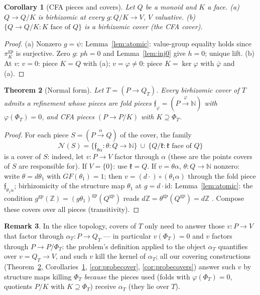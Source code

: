 \documentclass[11pt]{article}
\newtheorem{theorem}{Theorem}[section]
\newtheorem{corollary}[theorem]{Corollary}
\theoremstyle{definition}
\newtheorem{remark}[theorem]{Remark}
\newcommand{\gp}{\mathrm{gp}}
\newcommand{\Z}{\mathbb{Z}}
\begin{document}
\begin{corollary}[CFA pieces and covers]\label{cor:cfa}
Let $Q$ be a monoid and $K$ a face.
\textup{(}a\textup{)} $Q\to Q/K$ is birhizomic at every
$g:Q/K\to V$, $V$ valuative.
\textup{(}b\textup{)} $\{Q\to Q/K:K\text{ face of }Q\}$ is a
birhizomic cover \textup{(}the \emph{CFA cover}\textup{)}.
\end{corollary}

\begin{proof}
(a) Nonzero $g=\psi$: Lemma~\ref{lem:atomic}: value-group equality
holds since $\pi_K^{\gp}$ is surjective. Zero $g$: $ph=0$ and
Lemma~\ref{lem:inj0} give $h=0$; unique lift.
(b) At $v$: $v=0$: piece $K=Q$ with (a); $v=\varphi\ne0$: piece
$K=\ker\varphi$ with $\bar\varphi$ and (a).
\end{proof}

\begin{theorem}[Normal form]\label{thm:normalform}
Let $T=(P\to Q_T)$. Every birhizomic cover of $T$ admits a refinement
whose pieces are fold pieces $\mathfrak f_\varphi=
(P\xrightarrow{\varphi}\mathbb N)$ with $\varphi(\Phi_T)=0$, 
and CFA
pieces $(P\to P/K)$ with $K\supseteq\Phi_T$.
\end{theorem}

\begin{proof}
For each piece $S=(P\xrightarrow{\alpha}Q)$ of the cover, 
the family
\[
\mathcal N(S)=
\{\mathfrak f_{\theta\alpha}:\theta:Q\to\mathbb N\}
\ \cup\ \{Q/\mathfrak k:\mathfrak k\text{ face of }Q\}
\]
is a cover of $S$: indeed, let $v:P\to V$ factor through
$\alpha$ (these are the points covers of $S$ are responsible for).
If $V=\{0\}$: use $\mathfrak k=Q$. If $v=\theta\alpha$,
$\theta:Q\to\mathbb N$ nonzero: write $\theta=d\theta_1$ with
${GF}(\theta_1)=1$; then $v=(d\cdot)\circ(\theta_1\alpha)$ through
the fold piece $\mathfrak f_{\theta_1\alpha}$; birhizomicity of the
structure map $\theta_1$ at $g=d\cdot\mathrm{id}$:
Lemma~\ref{lem:atomic}: the condition
$g^{\gp}(\Z)=(g\theta_1)^{\gp}(Q^{\gp})$ reads
$d\Z=\theta^{\gp}(Q^{\gp})=d\Z$ \checkmark. Compose these covers over all
pieces (transitivity).
\end{proof}

\begin{remark}\label{rem:cover-points}
In the slice topology, covers of $T$ only need to answer those
$v:P\to V$ that factor through $\alpha_T:P\to Q_T$ --- in
particular $v(\Phi_T)=0$ and $v$ factors through
$P\to P/\Phi_T$: the problem's definition applied to the object
$\alpha_T$ quantifies over $v=Q_T\to V$, and such $v$ kill the
kernel of $\alpha_T$; all our covering constructions
(Theorem~\ref{thm:normalform}, Corollaries~\ref{cor:cfa},
\ref{cor:probecover}, \ref{cor:probecovers}) answer such $v$ by
structure maps killing $\Phi_T$ \emph{because} the pieces used
(folds with $\varphi(\Phi_T)=0$, quotients $P/K$ with
$K\supseteq\Phi_T$) receive $\alpha_T$ (they lie over $T$).
\end{remark}
\end{document}
